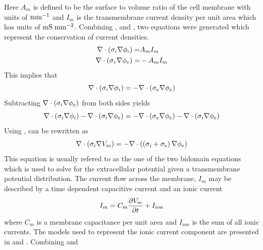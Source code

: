 Here $A_m$ is defined to be the surface to volume ratio of the cell membrane
with units of $\mathrm{\mathrm{mm}^{-1}}$ and
$I_m$ is the transmembrane current density per unit area which has units of
$\mathrm{mS}\thickspace\mathrm{mm}^{-2}$. Combining
,  and
, two equations were generated which
represent the conservation of current densities.
\begin{align}
    \nabla   \cdot  \left( \sigma_i  \nabla {\phi_i} \right)  =& A_mI_m
  \label{eqn:current_dens_conserv_1} \\
    \nabla   \cdot  \left( \sigma_e  \nabla {\phi_e} \right)  =& -A_mI_m
  \label{eqn:current_dens_conserv_2}
\end{align}
This implies that
\begin{equation}
    \nabla   \cdot  \left( \sigma_i  \nabla {\phi_i} \right)  = 
  -  \nabla   \cdot  \left( \sigma_e  \nabla {\phi_e} \right) 
  \label{eqn:current_dens_conserv_3}
\end{equation}
Subtracting $  \nabla   \cdot  \left( \sigma_i  \nabla {\phi_e} \right) $ from both sides yields
\begin{equation}
    \nabla   \cdot  \left( \sigma_i  \nabla {\phi_i} \right)  
  -  \nabla   \cdot  \left( \sigma_i  \nabla {\phi_e} \right)  =
  -  \nabla   \cdot  \left( \sigma_e  \nabla {\phi_e} \right)  
  -  \nabla   \cdot  \left( \sigma_i  \nabla {\phi_e} \right) 
  \label{eqn:current_dens_conserv_4}
\end{equation}
Using ,  can
be rewritten as
\begin{equation}
    \nabla   \cdot  \left( \sigma_i  \nabla {V_m} \right)  = 
  -  \nabla   \cdot  \left( \left( \sigma_i + \sigma_e \right)  \nabla {\phi_e} \right) 
  \label{eqn:first_bidomain_equation}
\end{equation}
This equation is usually refered to as the one of the two bidomain
equations which is used to solve for the extracellular potential given a
transmembrane potential distribution. The current flow across the
membrane, $I_m$ may be described by a time dependent capacitive current and an
ionic current
\begin{equation}
  I_m = C_m  \dfrac{\partial V_m}{\partial t}  + I_{ion}
  \label{eqn:membrane_current_flow}
\end{equation}
where $C_m$ is a membrane capacitance per unit area and $I_{ion}$ is the sum
of all ionic currents. The models used to 
represent the ionic
current component are presented in
 and
. Combining
 and 
